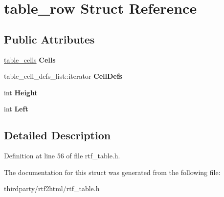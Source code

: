 \hypertarget{structtable__row}{}\section{table\+\_\+row Struct Reference}
\label{structtable__row}
\subsection*{Public Attributes}
\begin{DoxyCompactItemize}
\item 
\mbox{\label{structtable__row_a68b143a2dce3f563ca3e45747f0e1e77}} 
\hyperlink{classkilling__ptr__vector}{table\+\_\+cells} {\bfseries Cells}
\item 
\mbox{\label{structtable__row_a3cb5e19ee4ff4cbeeaf8eb745674028e}} 
table\+\_\+cell\+\_\+defs\+\_\+list\+::iterator {\bfseries Cell\+Defs}
\item 
\mbox{\label{structtable__row_a72599d9a82ddef5470b151860af9ef91}} 
int {\bfseries Height}
\item 
\mbox{\label{structtable__row_a80aa1f04e590a2fcf49444e27598d375}} 
int {\bfseries Left}
\end{DoxyCompactItemize}


\subsection{Detailed Description}


Definition at line 56 of file rtf\+\_\+table.\+h.



The documentation for this struct was generated from the following file\+:\begin{DoxyCompactItemize}
\item 
thirdparty/rtf2html/rtf\+\_\+table.\+h\end{DoxyCompactItemize}
